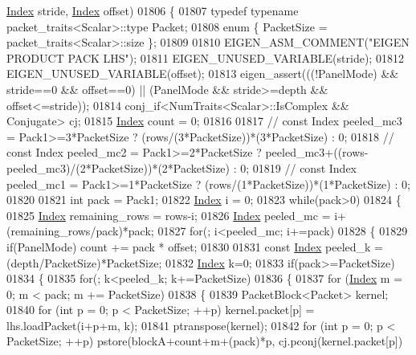 \begin{DoxyCode}
      \hyperlink{namespace_eigen_a62e77e0933482dafde8fe197d9a2cfde}{Index} stride, \hyperlink{namespace_eigen_a62e77e0933482dafde8fe197d9a2cfde}{Index} offset)
01806 \{
01807   \textcolor{keyword}{typedef} \textcolor{keyword}{typename} packet\_traits<Scalar>::type Packet;
01808   \textcolor{keyword}{enum} \{ PacketSize = packet\_traits<Scalar>::size \};
01809 
01810   EIGEN\_ASM\_COMMENT(\textcolor{stringliteral}{"EIGEN PRODUCT PACK LHS"});
01811   EIGEN\_UNUSED\_VARIABLE(stride);
01812   EIGEN\_UNUSED\_VARIABLE(offset);
01813   eigen\_assert(((!PanelMode) && stride==0 && offset==0) || (PanelMode && stride>=depth && offset<=stride));
01814   conj\_if<NumTraits<Scalar>::IsComplex && Conjugate> cj;
01815   \hyperlink{namespace_eigen_a62e77e0933482dafde8fe197d9a2cfde}{Index} count = 0;
01816 
01817 \textcolor{comment}{//   const Index peeled\_mc3 = Pack1>=3*PacketSize ? (rows/(3*PacketSize))*(3*PacketSize) : 0;}
01818 \textcolor{comment}{//   const Index peeled\_mc2 = Pack1>=2*PacketSize ?
       peeled\_mc3+((rows-peeled\_mc3)/(2*PacketSize))*(2*PacketSize) : 0;}
01819 \textcolor{comment}{//   const Index peeled\_mc1 = Pack1>=1*PacketSize ? (rows/(1*PacketSize))*(1*PacketSize) : 0;}
01820 
01821   \textcolor{keywordtype}{int} pack = Pack1;
01822   \hyperlink{namespace_eigen_a62e77e0933482dafde8fe197d9a2cfde}{Index} i = 0;
01823   \textcolor{keywordflow}{while}(pack>0)
01824   \{
01825     \hyperlink{namespace_eigen_a62e77e0933482dafde8fe197d9a2cfde}{Index} remaining\_rows = rows-i;
01826     \hyperlink{namespace_eigen_a62e77e0933482dafde8fe197d9a2cfde}{Index} peeled\_mc = i+(remaining\_rows/pack)*pack;
01827     \textcolor{keywordflow}{for}(; i<peeled\_mc; i+=pack)
01828     \{
01829       \textcolor{keywordflow}{if}(PanelMode) count += pack * offset;
01830 
01831       \textcolor{keyword}{const} \hyperlink{namespace_eigen_a62e77e0933482dafde8fe197d9a2cfde}{Index} peeled\_k = (depth/PacketSize)*PacketSize;
01832       \hyperlink{namespace_eigen_a62e77e0933482dafde8fe197d9a2cfde}{Index} k=0;
01833       \textcolor{keywordflow}{if}(pack>=PacketSize)
01834       \{
01835         \textcolor{keywordflow}{for}(; k<peeled\_k; k+=PacketSize)
01836         \{
01837           \textcolor{keywordflow}{for} (\hyperlink{namespace_eigen_a62e77e0933482dafde8fe197d9a2cfde}{Index} m = 0; m < pack; m += PacketSize)
01838           \{
01839             PacketBlock<Packet> kernel;
01840             \textcolor{keywordflow}{for} (\textcolor{keywordtype}{int} p = 0; p < PacketSize; ++p) kernel.packet[p] = lhs.loadPacket(i+p+m, k);
01841             ptranspose(kernel);
01842             \textcolor{keywordflow}{for} (\textcolor{keywordtype}{int} p = 0; p < PacketSize; ++p) pstore(blockA+count+m+(pack)*p, cj.pconj(kernel.packet[p])

\end{DoxyCode}
